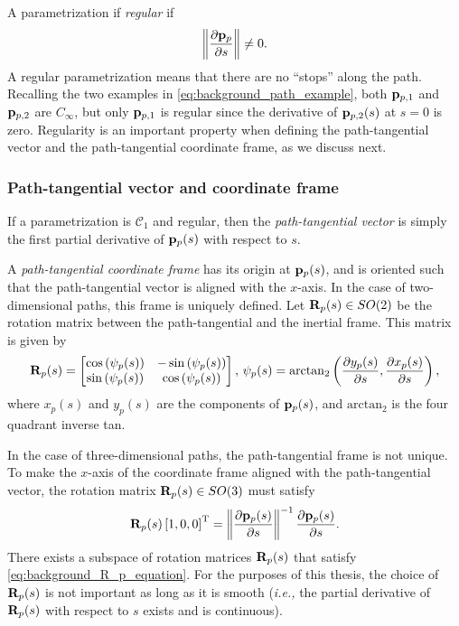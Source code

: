 A parametrization if \emph{regular} if
\begin{equation}
    \left\|\frac{\partial \mathbf{p}_p}{\partial s}\right\| \neq 0.
\end{equation}
A regular parametrization means that there are no ``stops'' along the path.
Recalling the two examples in \eqref{eq:background_path_example}, both $\mathbf{p}_{p, 1}$ and $\mathbf{p}_{p, 2}$ are $C_{\infty}$, but only $\mathbf{p}_{p, 1}$ is regular since the derivative of $\mathbf{p}_{p, 2}(s)$ at $s = 0$ is zero.
Regularity is an important property when defining the path-tangential vector and the path-tangential coordinate frame, as we discuss next.

\subsubsection*{Path-tangential vector and coordinate frame}
If a parametrization is $\mathcal{C}_1$ and regular, then the \emph{path-tangential vector} is simply the first partial derivative of $\mathbf{p}_p(s)$ with respect to $s$.

A \emph{path-tangential coordinate frame} has its origin at $\mathbf{p}_p(s)$, and is oriented such that the path-tangential vector is aligned with the $x$-axis.
In the case of two-dimensional paths, this frame is uniquely defined.
Let $\mathbf{R}_p(s) \in SO(2)$ be the rotation matrix between the path-tangential and the inertial frame.
This matrix is given by
\begin{equation}
    \mathbf{R}_p(s) = 
    \begin{bmatrix}
        \cos\left(\psi_{p}(s)\right) & -\sin\left(\psi_{p}(s)\right) \\ \sin\left(\psi_{p}(s)\right) & \cos\left(\psi_{p}(s)\right)
    \end{bmatrix}, \,
    \psi_{p}(s) = \mathrm{arctan}_{2}\left(\frac{\partial  y_{p}(s)}{\partial s}, \frac{\partial  x_{p}(s)}{\partial s}\right),
\end{equation}
where $x_p(s)$ and $y_p(s)$ are the components of $\mathbf{p}_p(s)$, and $\mathrm{arctan}_2$ is the four quadrant inverse tan.

In the case of three-dimensional paths, the path-tangential frame is not unique.
To make the $x$-axis of the coordinate frame aligned with the path-tangential vector, the rotation matrix $\mathbf{R}_p(s) \in SO(3)$ must satisfy
\begin{equation}
    \mathbf{R}_p(s) \left[1, 0, 0\right]^{\mathrm{T}} = \left\|\frac{\partial \mathbf{p}_p(s)}{\partial s}\right\|^{-1} \frac{\partial \mathbf{p}_p(s)}{\partial s}.
    \label{eq:background_R_p_equation}
\end{equation}
There exists a subspace of rotation matrices $\mathbf{R}_p(s)$ that satisfy \eqref{eq:background_R_p_equation}.
For the purposes of this thesis, the choice of $\mathbf{R}_p(s)$ is not important as long as it is smooth (\emph{i.e.,} the partial derivative of $\mathbf{R}_p(s)$ with respect to $s$ exists and is continuous).

